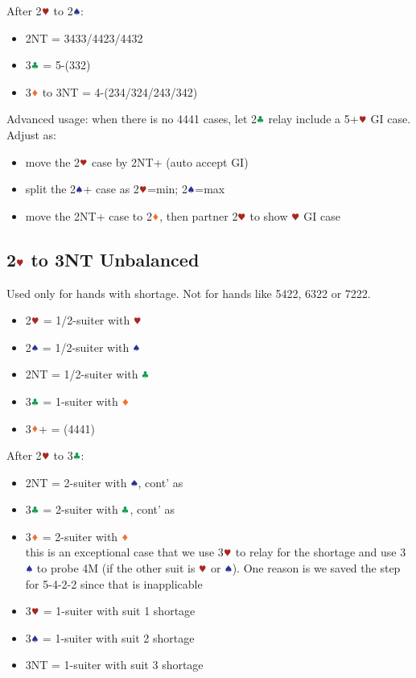 \documentclass{article}
\newcommand*{\ccc}{\textcolor{ForestGreen}{\clubsuit}}
\newcommand*{\ddd}{\textcolor{Orange}{\vardiamondsuit}}
\newcommand*{\hhh}{\textcolor{Mahogany}{\varheartsuit}}
\newcommand*{\sss}{\textcolor{Blue}{\spadesuit}}
\begin{document}
\begin{multicols}{2}
\noindent After 2$\hhh$ to 2$\sss$:
\begin{itemize}
    \setlength\itemsep{-0.2em}
    \item 2NT = 3433/4423/4432
    \item 3$\ccc$ = 5-(332)
    \item 3$\ddd$ to 3NT = 4-(234/324/243/342)
\end{itemize}

\noindent Advanced usage: when there is no 4441 cases, let 2$\ccc$ relay include a 5+$\hhh$ GI case. Adjust as:
\begin{itemize}
    \setlength\itemsep{-0.2em}
    \item move the 2$\hhh$ case by 2NT+ (auto accept GI)
    \item split the 2$\sss$+ case as 2$\hhh$=min; 2$\sss$=max
    \item move the 2NT+ case to 2$\ddd$, then partner 2$\hhh$ to show $\hhh$ GI case
\end{itemize}

\subsection{2$\hhh$ to 3NT Unbalanced}
\label{sec:2h-3nt-unbal}
Used only for hands with shortage. Not for hands like 5422, 6322 or 7222.

\begin{itemize}
    \setlength\itemsep{-0.2em}
    \item 2$\hhh$ = 1/2-suiter with $\hhh$
    \item 2$\sss$ = 1/2-suiter with $\sss$
    \item 2NT = 1/2-suiter with $\ccc$
    \item 3$\ccc$ = 1-suiter with $\ddd$
    \item 3$\ddd$+ = (4441)
\end{itemize}

\noindent After 2$\hhh$ to 3$\ccc$:
\begin{itemize}
    \setlength\itemsep{-0.2em}
    \item 2NT = 2-suiter with $\sss$, cont' as 
    \item 3$\ccc$ = 2-suiter with $\ccc$, cont' as 
    \item 3$\ddd$ = 2-suiter with $\ddd$ \\
        this is an exceptional case that we use 3$\hhh$ to relay for the shortage and use 3$\sss$ to probe 4M (if the other suit is $\hhh$ or $\sss$). One reason is we saved the step for 5-4-2-2 since that is inapplicable
    \item 3$\hhh$ = 1-suiter with suit 1 shortage
    \item 3$\sss$ = 1-suiter with suit 2 shortage
    \item 3NT = 1-suiter with suit 3 shortage
\end{itemize}


\end{multicols}
\end{document}
